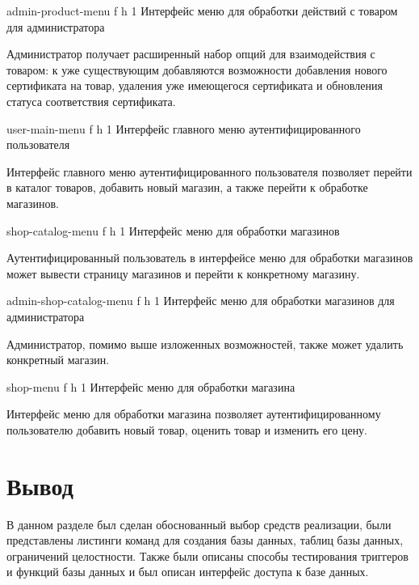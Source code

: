 {admin-product-menu} %
{f} %
{h} %
{1\textwidth} %
{Интерфейс меню для обработки действий с товаром для администратора} %

Администратор получает расширенный набор опций для взаимодействия с товаром: к уже существующим добавляются возможности добавления нового сертификата на товар, удаления уже имеющегося сертификата и обновления статуса соответствия сертификата.

{user-main-menu} %
{f} %
{h} %
{1\textwidth} %
{Интерфейс главного меню аутентифицированного пользователя} %

\clearpage 

Интерфейс главного меню аутентифицированного пользователя позволяет перейти в каталог товаров, добавить новый магазин, а также перейти к обработке магазинов.

{shop-catalog-menu} %
{f} %
{h} %
{1\textwidth} %
{Интерфейс меню для обработки магазинов} %

Аутентифицированный пользователь в интерфейсе меню для обработки магазинов может вывести страницу магазинов и перейти к конкретному магазину.

{admin-shop-catalog-menu} %
{f} %
{h} %
{1\textwidth} %
{Интерфейс меню для обработки магазинов для администратора} %

Администратор, помимо выше изложенных возможностей, также может удалить конкретный магазин.

\clearpage

{shop-menu} %
{f} %
{h} %
{1\textwidth} %
{Интерфейс меню для обработки магазина} %

Интерфейс меню для обработки магазина позволяет аутентифицированному пользователю добавить новый товар,  оценить товар и изменить его цену.


\section*{Вывод}

В данном разделе был сделан обоснованный выбор средств реализации, были представлены листинги команд для создания базы данных, таблиц базы данных, ограничений целостности. Также были описаны способы тестирования триггеров и функций базы данных и был описан интерфейс доступа к базе данных.
